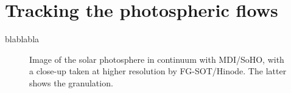 \documentclass[braunschweig]{2009-11-14-thesis}
\begin{document}
\section{Tracking the photospheric flows}

blablabla

\begin{figure}[h]
\centering
\caption{Image of the solar photosphere in continuum with MDI/SoHO,  
with a close-up taken at higher resolution by FG-SOT/Hinode. The  
latter shows the granulation.}  \label{granulation}
\end{figure}	
\end{document}
